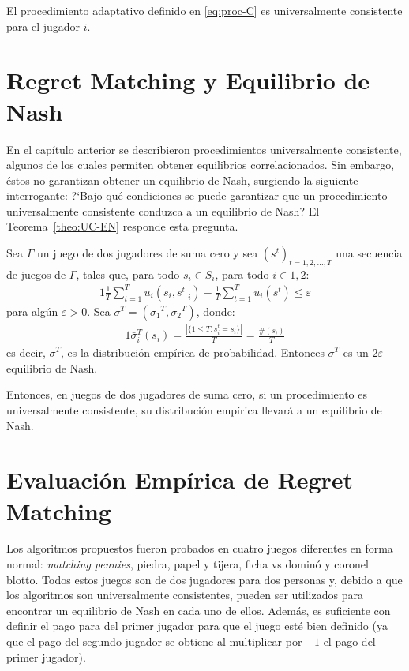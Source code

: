 \begin{theorem}
\label{theo:conv-proc-C}
El procedimiento adaptativo definido en \eqref{eq:proc-C} es universalmente consistente para el jugador $i$.
\end{theorem}


\section{Regret Matching y Equilibrio de Nash}

En el capítulo anterior se describieron procedimientos universalmente consistente, algunos de los cuales permiten obtener equilibrios correlacionados. Sin embargo, éstos no garantizan obtener un equilibrio de Nash, surgiendo la siguiente interrogante: ?`Bajo qué condiciones se puede garantizar que un procedimiento universalmente consistente conduzca a un equilibrio de Nash? El Teorema~\ref{theo:UC-EN} responde esta pregunta.

\begin{theorem}
\label{theo:UC-EN}
Sea $\Gamma$ un juego de dos jugadores de suma cero y sea $(s^t)_{t=1,2,..., T}$ una secuencia de juegos de $\Gamma$, tales que, para todo $s_i \in S_i$, para todo $i \in {1, 2}$:
\begin{alignat}{1}
\frac{1}{T}\sum_{t = 1}^{T}u_i(s_i, s_{-i}^t) - \frac{1}{T} \sum_{t = 1}^T u_i(s^t) \leq \varepsilon
\end{alignat}
para algún $\varepsilon > 0$. Sea $\bar{\sigma}^T = (\bar{\sigma_1}^T, \bar{\sigma_2}^T)$, donde:
\begin{alignat}{1}
\bar{\sigma}_i^T(s_i) = \frac{ |\{ 1 \leq T : s_i^t = s_i\}|}{T} = \frac{\#(s_i)}{T}
\end{alignat}
es decir, $\bar{\sigma}^T$, es la distribución empírica de probabilidad. Entonces $\bar{\sigma}^T$ es un $2\varepsilon$-equilibrio de Nash.
\end{theorem}

Entonces, en juegos de dos jugadores de suma cero, si un procedimiento es universalmente consistente, su distribución empírica llevará a un equilibrio de Nash. 

\section{Evaluación Empírica de Regret Matching}

Los algoritmos propuestos fueron probados en cuatro juegos diferentes en forma normal: \textit{matching pennies}, piedra, papel y tijera, ficha vs dominó y coronel blotto. Todos estos juegos son de dos jugadores para dos personas y, debido a que los algoritmos son universalmente consistentes, pueden ser utilizados para encontrar un equilibrio de Nash en cada uno de ellos. Además, es suficiente con definir el pago para del primer jugador para que el juego esté bien definido (ya que el pago del segundo jugador se obtiene al multiplicar por $-1$ el pago del primer jugador). 

